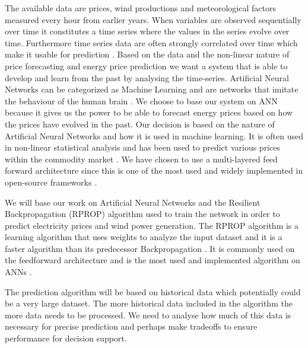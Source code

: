 The available data are prices, wind productions and meteorological factors measured every hour from earlier years. When variables are observed sequentially over time it constitutes a time series where the values in the series evolve over time. Furthermore time series data are often strongly correlated over time which make it usable for prediction \cite[Chapter~7.1.2]{econometrics}. Based on the data and the non-linear nature of price forecasting and energy price prediction we want a system that is able to develop and learn from the past by analysing the time-series. Artificial Neural Networks can be categorized as Machine Learning \cite{18} and are networks that imitate the behaviour of the human brain \cite{1}. We choose to base our system on ANN because it gives us the power to be able to forecast energy prices based on how the prices have evolved in the past. Our decision is based on the nature of Artificial Neural Networks and how it is used in machine learning. It is often used in non-linear statistical analysis \cite{16} and has been used to predict various prices within the commodity market \cite{2,3,stockForecasting,pjmForecast}. We have chosen to use a multi-layered feed forward architecture since this is one of the most used and widely implemented in open-source frameworks \cite{17}.

We will base our work on Artificial Neural Networks and the Resilient Backpropagation (RPROP) algorithm used to train the network in order to predict electricity prices and wind power generation. The RPROP algorithm is a learning algorithm that uses weights to analyze the input dataset\cite{17} and it is a faster algorithm than its predecessor Backpropagation \cite{8,15}. It is commonly used on the feedforward architecture and is the most used and implemented algorithm on ANNs \cite{14,17}.

The prediction algorithm will be based on historical data which potentially could be a very large dataset. The more historical data included in the algorithm the more data needs to be processed. We need to analyse how much of this data is necessary for precise prediction and perhaps make tradeoffs to ensure performance for decision support.